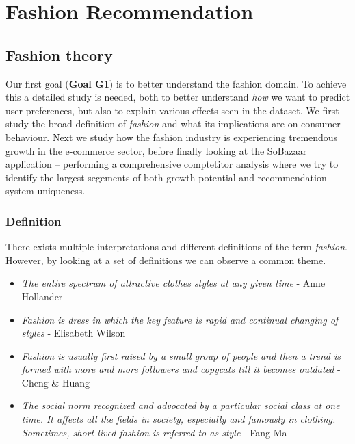 
\section{Fashion Recommendation}

\subsection{Fashion theory}
\label{subsec:fashion-theory}

Our first goal (\textbf{Goal G1}) is to better understand the fashion domain.
To achieve this a detailed study is needed, both to better understand
\textit{how} we want to predict user preferences, but also to explain various
effects seen in the dataset. We first study the broad definition of
\textit{fashion} and what its implications are on consumer behaviour. Next we
study how the fashion industry is experiencing tremendous growth in the
e-commerce sector, before finally looking at the SoBazaar application –
performing a comprehensive comptetitor analysis where we try to identify the
largest segements of both growth potential and recommendation system
uniqueness.

\subsubsection{Definition}

There exists multiple interpretations and different definitions of the term
\textit{fashion}. However, by looking at a set of definitions we can observe a
common theme.

\begin{itemize}
    \item \textit{The entire spectrum of attractive clothes styles at any given
    time} - Anne Hollander

    \item \textit{Fashion is dress in which the key feature is rapid and continual
    changing of styles} - Elisabeth Wilson

    \item \textit{Fashion is usually first raised by a small group of people
    and then a trend is formed with more and more followers and copycats till
    it becomes outdated} - Cheng \& Huang 

    \item \textit{The social norm recognized and advocated by a particular
    social class at one time. It affects all the fields in society, especially
    and famously in clothing. Sometimes, short-lived fashion is referred to as
    style} - Fang Ma \cite{Fang2012}

\end{itemize}

